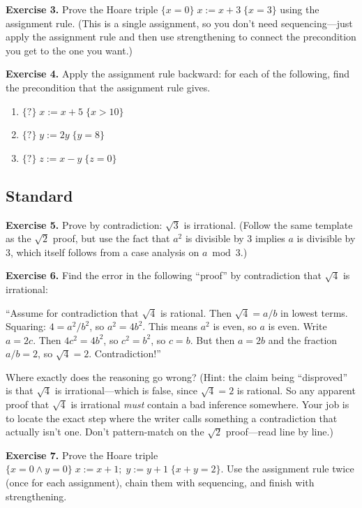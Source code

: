 \documentclass[11pt]{article}
\begin{document}
\bigskip
\textbf{Exercise 3.}\label{ex:m7:3} Prove the Hoare triple $\{x = 0\}\; x := x + 3\;\{x = 3\}$ using the assignment rule. (This is a single assignment, so you don't need sequencing---just apply the assignment rule and then use strengthening to connect the precondition you get to the one you want.)

\bigskip
\textbf{Exercise 4.}\label{ex:m7:4} Apply the assignment rule backward: for each of the following, find the precondition that the assignment rule gives.
\begin{enumerate}[label=(\alph*)]
  \item $\{?\} \; x := x + 5 \; \{x > 10\}$
  \item $\{?\} \; y := 2 y \; \{y = 8\}$
  \item $\{?\} \; z := x - y \; \{z = 0\}$
\end{enumerate}

\subsection*{Standard}

\textbf{Exercise 5.}\label{ex:m7:5} Prove by contradiction: $\sqrt{3}$ is irrational. (Follow the same template as the $\sqrt{2}$ proof, but use the fact that $a^2$ is divisible by $3$ implies $a$ is divisible by $3$, which itself follows from a case analysis on $a \bmod 3$.)

\bigskip
\textbf{Exercise 6.}\label{ex:m7:6} Find the error in the following ``proof'' by contradiction that $\sqrt{4}$ is irrational:

``Assume for contradiction that $\sqrt{4}$ is rational. Then $\sqrt{4} = a/b$ in lowest terms. Squaring: $4 = a^2/b^2$, so $a^2 = 4b^2$. This means $a^2$ is even, so $a$ is even. Write $a = 2c$. Then $4c^2 = 4b^2$, so $c^2 = b^2$, so $c = b$. But then $a = 2b$ and the fraction $a/b = 2$, so $\sqrt{4} = 2$. Contradiction!''

Where exactly does the reasoning go wrong? (Hint: the claim being ``disproved'' is that $\sqrt{4}$ is irrational---which is false, since $\sqrt{4} = 2$ is rational. So any apparent proof that $\sqrt{4}$ is irrational \emph{must} contain a bad inference somewhere. Your job is to locate the exact step where the writer calls something a contradiction that actually isn't one. Don't pattern-match on the $\sqrt{2}$ proof---read line by line.)

\bigskip
\textbf{Exercise 7.}\label{ex:m7:7} Prove the Hoare triple $\{x = 0 \wedge y = 0\}\; x := x + 1;\; y := y + 1\;\{x + y = 2\}$. Use the assignment rule twice (once for each assignment), chain them with sequencing, and finish with strengthening.
\end{document}
